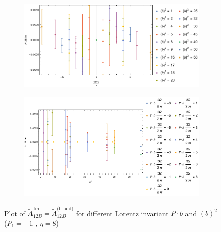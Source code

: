 \documentclass[]{article}
\numberwithin{equation}{section}
\newcommand{\tAmp}{\widetilde{A}}
\newcommand{\tAmp}{\ensuremath{\widetilde{A}^{(+)}}}
\begin{document}
\begin{figure}[h!]
     \centering
     \begin{subfigure}[b]{0.45\textwidth}
         \centering
         \includegraphics[width=\textwidth]{Amp_plots/bP_A12B_b_odd_P1_-1_eta_8.pdf}
     \end{subfigure}
     \begin{subfigure}[b]{0.45\textwidth}
         \centering
         \includegraphics[width=\textwidth]{Amp_plots/bsq_A12B_b_odd_P1_-1_eta_8.pdf}
     \end{subfigure}
        \caption{Plot of $\tAmp^{\text{Im}}_{12B}=\tAmp^{\text{(b-odd)}}_{12B}$ for different Lorentz invariant $P\cdot b$ and $(b)^2$  ($P_{1} = -1$ , $\eta=8$)}
\end{figure}
\end{document}

